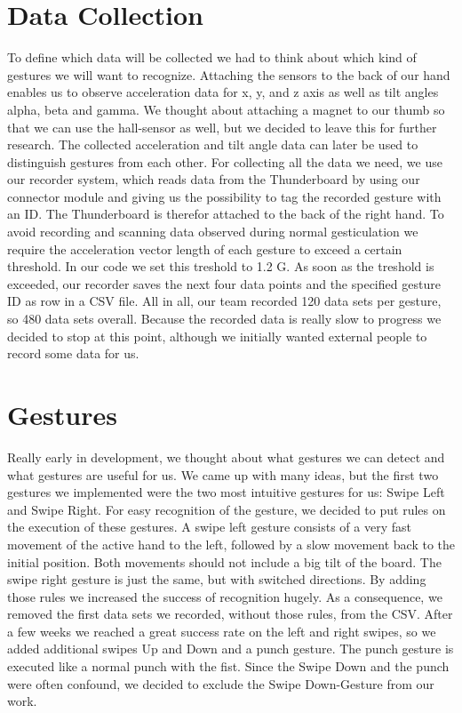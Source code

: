 \section{Data Collection}
\label{ch:DataCollection:sec:DataCollection}

To  define  which  data  will  be  collected  we  had  to  think  about  which  kind  of gestures  we  will  want  to  recognize.
Attaching  the  sensors  to  the  back  of  our  hand enables us to observe acceleration data  for x,  y, and z axis  as well  as tilt  angles  alpha, beta and gamma.
We thought about attaching a magnet to our thumb so that we can use the hall-sensor as well,  but we decided to leave this  for  further research.
The collected acceleration and tilt angle data can later be used to distinguish gestures from each other.
For collecting all the data we need, we use our recorder system, which reads data from the Thunderboard by using our connector module and giving us the possibility to tag the recorded gesture with an ID.
The Thunderboard is therefor attached to the back of the right hand.
To avoid recording and scanning data observed during normal gesticulation we require the acceleration vector length of each gesture to exceed a certain threshold.
In our code we set this treshold to 1.2 G.
As soon as the treshold is exceeded, our recorder saves the next four data points and the specified gesture ID as row in a CSV file.
All in all, our team recorded 120 data sets per gesture, so 480 data sets overall.
Because the recorded data is really slow to progress we decided to stop at this point, although we initially wanted external people to record some data for us.

\section{Gestures}
\label{ch:DataCollection:sec:Gestures}

Really early in development, we thought about what gestures we can detect and what gestures are useful for us.
We came up with many ideas, but the first two gestures we implemented were the two most intuitive gestures for us: Swipe Left and Swipe Right.
For easy recognition of the gesture, we decided to put rules on the execution of these gestures.
A \glqq swipe left\grqq{} gesture consists of a very fast movement of the active hand to the left, followed by a slow movement back to the initial position.
Both movements should not include a big tilt of the board.
The \glqq swipe right\grqq{} gesture is just the same, but with switched directions.
By adding those rules we increased the success of recognition hugely.
As a consequence, we removed the first data sets we recorded, without those rules, from the CSV.
After a few weeks we reached a great success rate on the left and right swipes, so we added additional swipes \glqq Up\grqq{} and \glqq Down\grqq{} and a punch gesture.
The punch gesture is executed like a normal punch with the fist.
Since the \glqq Swipe Down\grqq{} and the punch were often confound, we decided to exclude the \glqq Swipe Down\grqq -Gesture from our work.

